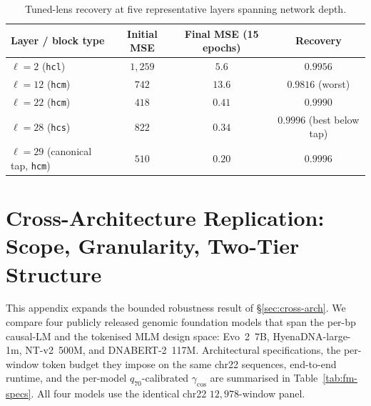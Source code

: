 \documentclass{article}
\theoremstyle{plain}
\theoremstyle{definition}
\theoremstyle{remark}
\begin{document}
\begin{table}[!htbp]
  \caption{Tuned-lens recovery at five representative layers spanning
  network depth.}
  \label{tab:tuned-lens}
  \centering
  \small
  \begin{tabular}{@{}lccc@{}}
    \toprule
    Layer / block type & Initial MSE & Final MSE (15 epochs) & Recovery \\
    \midrule
    $\ell=2$ (\texttt{hcl}) & $1{,}259$ & $5.6$ & $0.9956$ \\
    $\ell=12$ (\texttt{hcm}) & $742$ & $13.6$ & $0.9816$ (worst) \\
    $\ell=22$ (\texttt{hcm}) & $418$ & $0.41$ & $0.9990$ \\
    $\ell=28$ (\texttt{hcs}) & $822$ & $0.34$ & $0.9996$ (best below tap) \\
    $\ell=29$ (canonical tap, \texttt{hcm}) & $510$ & $0.20$ & $0.9996$ \\
    \bottomrule
  \end{tabular}
\end{table}

\section{Cross-Architecture Replication: Scope, Granularity, Two-Tier Structure}
\label{app:cross-arch}

This appendix expands the bounded robustness result of
\S\ref{sec:cross-arch}. We compare four publicly released genomic
foundation models that span the per-bp causal-LM and the tokenised MLM
design space: Evo~2~7B, HyenaDNA-large-1m, NT-v2~500M, and
DNABERT-2~117M. Architectural specifications, the per-window token budget
they impose on the same chr22 sequences, end-to-end runtime, and the
per-model $q_{70}$-calibrated $\gamma_{\cos}$ are summarised in
Table~\ref{tab:fm-specs}. All four models use the identical chr22
$12{,}978$-window panel.
\end{document}
